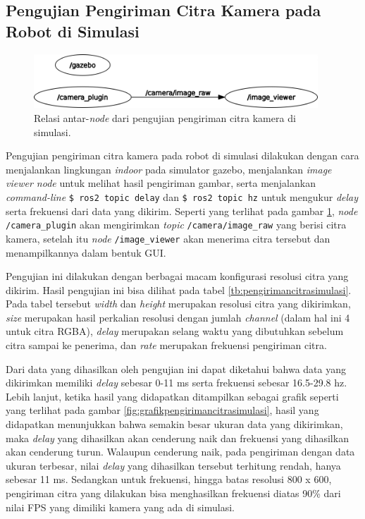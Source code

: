 \subsection{Pengujian Pengiriman Citra Kamera pada Robot di Simulasi}
\label{subsec:citrasimulasi}

\begin{figure}[ht]
  \centering
  \includegraphics[width=0.95\textwidth,keepaspectratio]{gambar/rosgraph-camera-plugin.png}
  \caption{Relasi antar-\emph{node} dari pengujian pengiriman citra kamera di simulasi.}
  \label{fig:rosgraphcameraplugin}
\end{figure}

Pengujian pengiriman citra kamera pada robot di simulasi dilakukan dengan cara menjalankan lingkungan \emph{indoor} pada simulator gazebo,
  menjalankan \emph{image viewer node} untuk melihat hasil pengiriman gambar,
  serta menjalankan \emph{command-line} \lstinline{$ ros2 topic delay} dan \lstinline{$ ros2 topic hz} untuk mengukur \emph{delay} serta frekuensi dari data yang dikirim.
Seperti yang terlihat pada gambar \ref{fig:rosgraphcameraplugin},
  \emph{node} \lstinline{/camera_plugin} akan mengirimkan \emph{topic} \lstinline{/camera/image_raw} yang berisi citra kamera,
  setelah itu \emph{node} \lstinline{/image_viewer} akan menerima citra tersebut dan menampilkannya dalam bentuk GUI.



Pengujian ini dilakukan dengan berbagai macam konfigurasi resolusi citra yang dikirim.
Hasil pengujian ini bisa dilihat pada tabel \ref{tb:pengirimancitrasimulasi}.
Pada tabel tersebut \emph{width} dan \emph{height} merupakan resolusi citra yang dikirimkan,
  \emph{size} merupakan hasil perkalian resolusi dengan jumlah \emph{channel} (dalam hal ini 4 untuk citra RGBA),
  \emph{delay} merupakan selang waktu yang dibutuhkan sebelum citra sampai ke penerima,
  dan \emph{rate} merupakan frekuensi pengiriman citra.



Dari data yang dihasilkan oleh pengujian ini dapat diketahui bahwa data yang dikirimkan memiliki \emph{delay} sebesar 0-11 ms serta frekuensi sebesar 16.5-29.8 hz.
Lebih lanjut, ketika hasil yang didapatkan ditampilkan sebagai grafik seperti yang terlihat pada gambar \ref{fig:grafikpengirimancitrasimulasi},
  hasil yang didapatkan menunjukkan bahwa semakin besar ukuran data yang dikirimkan,
  maka \emph{delay} yang dihasilkan akan cenderung naik dan frekuensi yang dihasilkan akan cenderung turun.
Walaupun cenderung naik, pada pengiriman dengan data ukuran terbesar,
  nilai \emph{delay} yang dihasilkan tersebut terhitung rendah, hanya sebesar 11 ms.
Sedangkan untuk frekuensi,
  hingga batas resolusi 800 x 600,
  pengiriman citra yang dilakukan bisa menghasilkan frekuensi diatas 90\% dari nilai FPS yang dimiliki kamera yang ada di simulasi.
